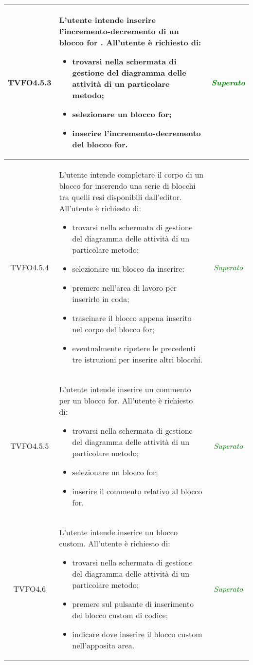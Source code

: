 \begin{longtable}{|c|>{}m{8cm}|c|}
\hypertarget{TVFO4.5.3}{TVFO4.5.3} & L'utente intende inserire l'incremento-decremento di un blocco for .
All'utente è richiesto di:
\begin{itemize}
	\item trovarsi nella schermata di gestione del diagramma delle attività di un particolare metodo;
	\item selezionare un blocco for;
	\item inserire l'incremento-decremento del blocco for.
\end{itemize} & \textcolor{Green}{\textit{Superato}}\\ \hline

\hypertarget{TVFO4.5.4}{TVFO4.5.4} & L'utente intende completare il corpo di un blocco for inserendo una serie di blocchi tra quelli resi disponibili dall'editor.
All'utente è richiesto di:
\begin{itemize}
	\item trovarsi nella schermata di gestione del diagramma delle attività di un particolare metodo;
	\item selezionare un blocco da inserire;
	\item premere nell'area di lavoro per inserirlo in coda;
	\item trascinare il blocco appena inserito nel corpo del blocco for;
	\item eventualmente ripetere le precedenti tre istruzioni per inserire altri blocchi.
\end{itemize} & \textcolor{Green}{\textit{Superato}}\\ \hline

\hypertarget{TVFO4.5.5}{TVFO4.5.5} & L'utente intende inserire un commento per un blocco for.
All'utente è richiesto di:
\begin{itemize}
	\item trovarsi nella schermata di gestione del diagramma delle attività di un particolare metodo;
	\item selezionare un blocco for;
	\item inserire il commento relativo al blocco for.
\end{itemize} & \textcolor{Green}{\textit{Superato}}\\ \hline

\hypertarget{TVFO4.6}{TVFO4.6} & L'utente intende inserire un blocco custom.
All'utente è richiesto di:
\begin{itemize}
	\item trovarsi nella schermata di gestione del diagramma delle attività di un particolare metodo;
	\item premere sul pulsante di inserimento del blocco custom di codice;
	\item indicare dove inserire il blocco custom nell'apposita area.
\end{itemize} & \textcolor{Green}{\textit{Superato}}\\ \hline


\end{longtable}
